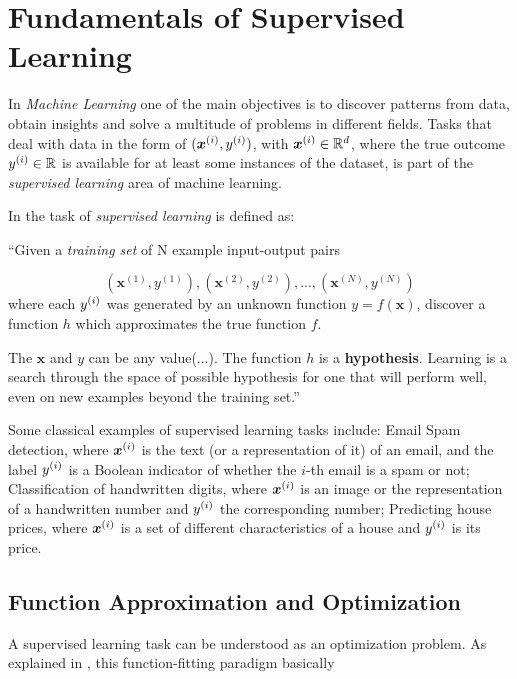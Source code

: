 \chapter{Fundamentals of Supervised Learning}
\label{cap:ml-fundamentals}

In \textit{Machine Learning} one of the main objectives is to discover patterns from data, obtain insights and solve a multitude of problems in different fields. Tasks that deal with data in the form of $(\bm{x}^{(i)},y^{(i)})$, with $\bm{x}^{(i)} \in \mathbb{R}^d$, where the true outcome $y^{(i)} \in \mathbb{R}$ is available for at least some instances of the dataset, is part of the \textit{supervised learning} area of machine learning.

In \cite{aima:2010} the task of \textit{supervised learning} is defined as:

\begin{displayquote}
``Given a \textit{training set} of N example input-output pairs

$$(\bm{x}^{(1)},y^{(1)}), (\bm{x}^{(2)},y^{(2)}), ..., (\bm{x}^{(N)},y^{(N)})$$
where each $y^{(i)}$ was generated by an unknown function $y = f(\bm{x})$, discover a function $h$ which approximates the true function $f$.

The $\bm{x}$ and $y$ can be any value(...). The function $h$ is a \textbf{hypothesis}. Learning is a search through the space of possible hypothesis for one that will perform well, even on new examples beyond the training set.''
\end{displayquote}

Some classical examples of supervised learning tasks include: Email Spam detection, where $\bm{x}^{(i)}$ is the text (or a representation of it) of an email, and the label $y^{(i)}$ is a Boolean indicator of whether the $i$-th email is a spam or not; Classification of handwritten digits, where $\bm{x}^{(i)}$ is an image or the representation of a handwritten number and $y^{(i)}$ the corresponding number; Predicting house prices, where $\bm{x}^{(i)}$ is a set of different characteristics of a house and $y^{(i)}$ is its price.

\section{Function Approximation and Optimization}

A supervised learning task can be understood as an optimization problem. As explained in \cite{hastie2009elements}, this function-fitting paradigm basically


